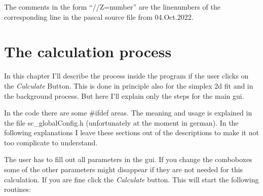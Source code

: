 \documentclass[11pt]{article} %
\begin{document}
The comments in the form ``//Z=number'' are the linenumbers of the corresponding line in the pascal source file from  04.Oct.2022.



\clearpage
\section{The calculation process}

In this chapter I'll describe the process inside the program if the user clicks on the {\it Calculate} Button. This is done in principle also for the simplex 2d fit and in the background process. But here I'll explain only the steps for the main gui.

In the code there are some \#ifdef areas. The meaning and usage is explained in the file sc\_globalConfig.h (unfortunately at the moment in german). In the following explanations I leave these sections out of the descriptions to make it not too complicate to understand.

The user has to fill out all parameters in the gui. If you change the comboboxes some of the other parameters might disappear if they are not needed for this calculation. If you are fine click the {\it Calculate} button. This will start the following routines:
\end{document}
